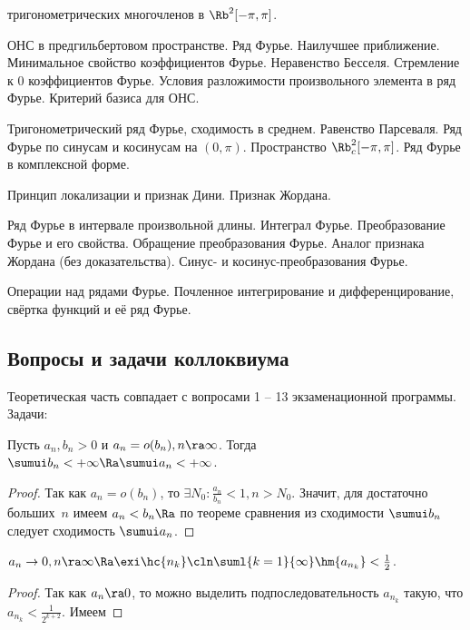 \documentclass[a4paper]{article}
\begin{document}
\begin{nums}{-2}
тригонометрических многочленов в $\Rb^2[-\pi,\pi]$.
\item ОНС в предгильбертовом пространстве. Ряд Фурье. Наилучшее приближение. Минимальное свойство коэффициентов Фурье.
Неравенство Бесселя. Стремление к 0 коэффициентов Фурье. Условия разложимости произвольного элемента в ряд
Фурье. Критерий базиса для ОНС.
\item Тригонометрический ряд Фурье, сходимость в среднем. Равенство Парсеваля. Ряд Фурье по синусам и
косинусам на $(0, \pi)$. Пространство $\Rb^2_c[-\pi,\pi]$. Ряд Фурье в комплексной форме.
\item Принцип локализации и признак Дини. Признак Жордана.
\item Ряд Фурье в интервале произвольной длины. Интеграл Фурье. Преобразование Фурье и его свойства. Обращение
преобразования Фурье. Аналог признака Жордана (без доказательства). Синус- и косинус-преобразования Фурье.
\item Операции над рядами Фурье. Почленное интегрирование и дифференцирование, свёртка функций и её ряд Фурье.
\end{nums}

\subsection{Вопросы и задачи коллоквиума}
Теоретическая часть совпадает с вопросами 1 -- 13 экзаменационной программы. Задачи:

\begin{problem}
Пусть $a_n, b_n > 0$ и $a_n=o(b_n), n \ra \infty$. Тогда $\sumui b_n < +\infty \Ra \sumui a_n < + \infty$.
\end{problem}

\begin{proof}
Так как $a_n=o(b_n)$, то $\exi N_0:  \frac{a_n}{b_n} < 1, n > N_0$. Значит, для достаточно больших~$n$
имеем $a_n < b_n \Ra$ по теореме сравнения из сходимости $\sumui b_n$ следует сходимость $\sumui a_n$.
\end{proof}

\begin{problem}
$a_n \rightarrow 0, n \ra \infty \Ra \exi \hc{n_k}\cln \suml{k=1}{\infty}
\hm{a_{n_k}} < \frac{1}{2}$.
\end{problem}

\begin{proof}
Так как $a_n \ra 0$, то  можно выделить подпоследовательность $a_{n_k}$ такую, что $a_{n_k} <
\frac{1}{2^{k+2}}$. Имеем 
\hfill\end{proof}
\end{document}
